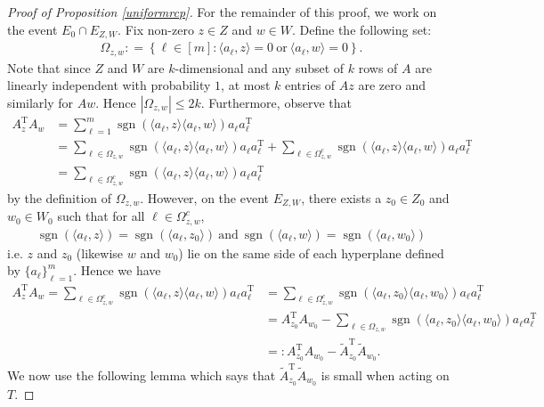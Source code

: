 \documentclass[11pt]{article}
\newcommand{\sgn}{\operatorname{sgn}}
\renewcommand{\top}{{\mathrm{T}}}
\theoremstyle{remark}
\begin{document}
\begin{proof}[Proof of Proposition \ref{uniformrcp}]
For the remainder of this proof, we work on the event $E_0 \cap E_{Z,W}$. Fix non-zero $z \in Z$ and $w \in W$. Define the following set: \begin{align*}
    \Omega_{z,w} : = \left\{\ell \in [m] : \langle a_{\ell}, z\rangle = 0\ \text{or}\ \langle a_{\ell}, w\rangle = 0\right\}.
\end{align*} Note that since $Z$ and $W$ are $k$-dimensional and any subset of $k$ rows of $A$ are linearly independent with probability $1$, at most $k$ entries of $Az$ are zero and similarly for $Aw$. Hence $|\Omega_{z,w}| \leqslant 2k$. Furthermore, observe that \begin{align*}
 A_{z}^\top A_w & = \sum_{\ell =1}^m\sgn(\langle a_{\ell},z\rangle \langle a_{\ell}, w\rangle) a_{\ell}a_{\ell}^\top \\
 & = \sum_{\ell \in \Omega_{z,w}}\sgn(\langle a_{\ell},z\rangle \langle a_{\ell}, w\rangle) a_{\ell}a_{\ell}^\top + \sum_{\ell \in \Omega_{z,w}^c}\sgn(\langle a_{\ell},z\rangle \langle a_{\ell}, w\rangle) a_{\ell}a_{\ell}^\top \\
 & = \sum_{\ell \in \Omega_{z,w}^c}\sgn(\langle a_{\ell},z\rangle \langle a_{\ell}, w\rangle) a_{\ell}a_{\ell}^\top
\end{align*} by the definition of $\Omega_{z,w}$. However, on the event $E_{Z,W}$, there exists a $z_0 \in Z_0$ and $w_0 \in W_0$ such that for all $\ell \in \Omega_{z,w}^c$, \begin{align*}
    \sgn(\langle a_{\ell},z\rangle) = \sgn(\langle a_{\ell},z_0\rangle)\ \text{and}\ \sgn(\langle a_{\ell},w\rangle) =  \sgn(\langle a_{\ell},w_0\rangle)
\end{align*} i.e. $z$ and $z_0$ (likewise $w$ and $w_0$) lie on the same side of each hyperplane defined by $\{a_{\ell}\}_{\ell=1}^m$. Hence we have \begin{align}
    A_{z}^\top A_w = \sum_{\ell \in \Omega_{z,w}^c}\sgn(\langle a_{\ell},z\rangle \langle a_{\ell}, w\rangle) a_{\ell}a_{\ell}^\top & = \sum_{\ell \in \Omega_{z,w}^c}\sgn(\langle a_{\ell},z_0\rangle \langle a_{\ell}, w_0\rangle) a_{\ell}a_{\ell}^\top \nonumber \\
    & = A_{z_0}^{\top}A_{w_0} - \sum_{\ell \in \Omega_{z,w}}\sgn(\langle a_{\ell},z_0\rangle \langle a_{\ell}, w_0\rangle) a_{\ell}a_{\ell}^\top \nonumber \\
    & =: A_{z_0}^{\top}A_{w_0} - \tilde{A}_{z_0}^{\top}\tilde{A}_{w_0}. \label{AzAw_as_Az0Aw0}
\end{align} We now use the following lemma which says that  $\tilde{A}_{z_0}^{\top}\tilde{A}_{w_0}$ is small when acting on $T$.


\end{proof}
\end{document}
